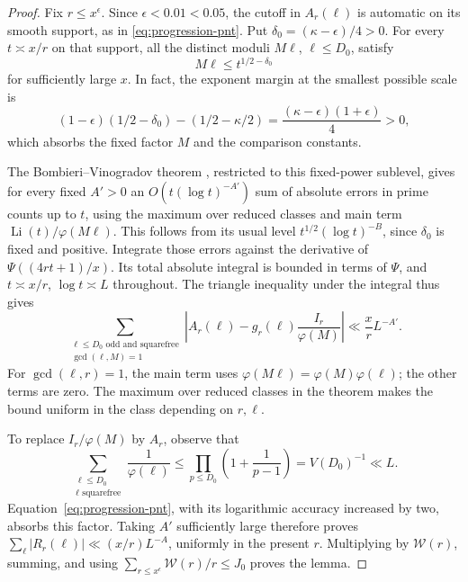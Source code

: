 \begin{proof}
Fix \(r\le x^\epsilon\).  Since \(\epsilon<0.01<0.05\), the cutoff in
\(A_r(\ell)\) is automatic on its smooth support, as in
\eqref{eq:progression-pnt}.  Put \(\delta_0=(\kappa-\epsilon)/4>0\).
For every \(t\asymp x/r\) on that support, all the distinct moduli
\(M\ell\), \(\ell\le D_0\), satisfy
\[
 M\ell\le t^{1/2-\delta_0}
\]
for sufficiently large \(x\).  In fact, the exponent margin at the
smallest possible scale is
\[
 (1-\epsilon)(1/2-\delta_0)-(1/2-\kappa/2)
       =\frac{(\kappa-\epsilon)(1+\epsilon)}4>0,
\]
which absorbs the fixed factor \(M\) and the comparison constants.

The Bombieri--Vinogradov theorem \cite{Bombieri1965,Vinogradov1965}, restricted to this
fixed-power sublevel, gives for every fixed \(A'>0\) an
\(O(t(\log t)^{-A'})\) sum of absolute errors in prime counts up to \(t\),
using the maximum over reduced classes and main term
\(\operatorname{Li}(t)/\varphi(M\ell)\).  This follows from its usual
level \(t^{1/2}(\log t)^{-B}\), since \(\delta_0\) is fixed and positive.
Integrate those errors against the derivative of
\(\Psi((4rt+1)/x)\).  Its total absolute integral is bounded in terms of
\(\Psi\), and \(t\asymp x/r\), \(\log t\asymp L\) throughout.  The triangle
inequality under the integral thus gives
\[
 \sum_{\substack{\ell\le D_0\text{ odd and squarefree}\\
                  \gcd(\ell,M)=1}}
 \left|A_r(\ell)-g_r(\ell)\frac{I_r}{\varphi(M)}\right|
       \ll \frac xr L^{-A'}.
\]
For \(\gcd(\ell,r)=1\), the main term uses
\(\varphi(M\ell)=\varphi(M)\varphi(\ell)\); the other terms are zero.
The maximum over reduced classes in the theorem makes the bound uniform
in the class depending on \(r,\ell\).

To replace \(I_r/\varphi(M)\) by \(A_r\), observe that
\[
 \sum_{\substack{\ell\le D_0\\\ell\text{ squarefree}}}\frac1{\varphi(\ell)}
 \le\prod_{p\le D_0}\left(1+\frac1{p-1}\right)
 =V(D_0)^{-1}\ll L.
\]
Equation~\eqref{eq:progression-pnt}, with its logarithmic accuracy
increased by two, absorbs this factor.  Taking \(A'\) sufficiently large
therefore proves \(\sum_\ell|R_r(\ell)|\ll(x/r)L^{-A}\), uniformly in
the present \(r\).  Multiplying by \(\mathcal W(r)\), summing, and using
\(\sum_{r\le x^\epsilon}\mathcal W(r)/r\le J_0\) proves the lemma.
\end{proof}

